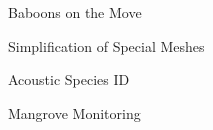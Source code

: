 \item Baboons on the Move
\item Simplification of Special Meshes
\item Acoustic Species ID
\item Mangrove Monitoring
